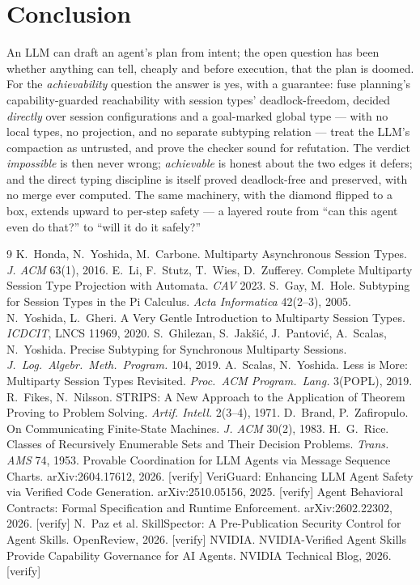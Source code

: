 \documentclass[11pt]{article}
\theoremstyle{plain}
\theoremstyle{definition}
\begin{document}
\section{Conclusion}
An LLM can draft an agent's plan from intent; the open question has been whether
anything can tell, cheaply and before execution, that the plan is doomed. For the
\emph{achievability} question the answer is yes, with a guarantee: fuse planning's
capability-guarded reachability with session types' deadlock-freedom, decided
\emph{directly} over session configurations and a goal-marked global type ---
with no local types, no projection, and no separate subtyping relation --- treat
the LLM's compaction as untrusted, and prove the checker sound for refutation.
The verdict \emph{impossible} is then never wrong; \emph{achievable} is honest
about the two edges it defers; and the direct typing discipline is itself proved
deadlock-free and preserved, with no merge ever computed. The same machinery, with
the diamond flipped to a box, extends upward to per-step safety --- a layered route
from ``can this agent even do that?'' to ``will it do it safely?''

\begin{thebibliography}{9}\small
{} K.~Honda, N.~Yoshida, M.~Carbone. Multiparty Asynchronous Session Types. \emph{J. ACM} 63(1), 2016.
 E.~Li, F.~Stutz, T.~Wies, D.~Zufferey. Complete Multiparty Session Type Projection with Automata. \emph{CAV} 2023.
 S.~Gay, M.~Hole. Subtyping for Session Types in the Pi Calculus. \emph{Acta Informatica} 42(2--3), 2005.
 N.~Yoshida, L.~Gheri. A Very Gentle Introduction to Multiparty Session Types. \emph{ICDCIT}, LNCS 11969, 2020.
 S.~Ghilezan, S.~Jak\v si\'c, J.~Pantovi\'c, A.~Scalas, N.~Yoshida. Precise Subtyping for Synchronous Multiparty Sessions. \emph{J.\ Log.\ Algebr.\ Meth.\ Program.} 104, 2019.
 A.~Scalas, N.~Yoshida. Less is More: Multiparty Session Types Revisited. \emph{Proc.\ ACM Program.\ Lang.} 3(POPL), 2019.
 R.~Fikes, N.~Nilsson. STRIPS: A New Approach to the Application of Theorem Proving to Problem Solving. \emph{Artif. Intell.} 2(3--4), 1971.
 D.~Brand, P.~Zafiropulo. On Communicating Finite-State Machines. \emph{J. ACM} 30(2), 1983.
 H.~G.~Rice. Classes of Recursively Enumerable Sets and Their Decision Problems. \emph{Trans. AMS} 74, 1953.
 Provable Coordination for LLM Agents via Message Sequence Charts. arXiv:2604.17612, 2026. [verify]
 VeriGuard: Enhancing LLM Agent Safety via Verified Code Generation. arXiv:2510.05156, 2025. [verify]
 Agent Behavioral Contracts: Formal Specification and Runtime Enforcement. arXiv:2602.22302, 2026. [verify]
 N.~Paz et al. SkillSpector: A Pre-Publication Security Control for Agent Skills. OpenReview, 2026. [verify]
 NVIDIA. NVIDIA-Verified Agent Skills Provide Capability Governance for AI Agents. NVIDIA Technical Blog, 2026. [verify]
\end{thebibliography}
\end{document}
